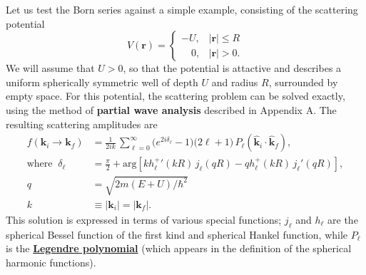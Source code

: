 \documentclass[pra,12pt]{revtex4}
\begin{document}
Let us test the Born series against a simple example, consisting of
the scattering potential
\begin{equation}
  V(\mathbf{r}) = \begin{cases}-U, & |\mathbf{r}| \le R \\ \;\;\;\,0,
    & |\mathbf{r}| > 0. \end{cases}
\end{equation}
We will assume that $U > 0$, so that the potential is attactive and
describes a uniform spherically symmetric well of depth $U$ and radius
$R$, surrounded by empty space.  For this potential, the scattering
problem can be solved exactly, using the method of \textbf{partial
  wave analysis} described in Appendix A.  The resulting scattering
amplitudes are
\begin{equation}
  \begin{aligned}f(\mathbf{k}_i \rightarrow \mathbf{k}_f) &= \frac{1}{2ik}\, \sum_{\ell =0}^\infty \big(e^{2i\delta_\ell} - 1\big) \big(2\ell+1\big)\, P_{\ell}(\hat{\mathbf{k}}_i\cdot \hat{\mathbf{k}}_f), \\ \mathrm{where}\;\; \delta_\ell &= \frac{\pi}{2} + \mathrm{arg}\!\left[k {h_\ell^+}'(kR) \, j_\ell(qR) - qh_\ell^+(kR)\, j_\ell'(qR)\right], \\ q &= \sqrt{2m(E+U)/\hbar^2} \\ k &\equiv |\mathbf{k}_i| = |\mathbf{k}_f|.\end{aligned}
\end{equation}
This solution is expressed in terms of various special functions;
$j_\ell$ and $h_\ell$ are the spherical Bessel function of the first
kind and spherical Hankel function, while $P_\ell$ is the
\href{https://en.wikipedia.org/wiki/Legendre_polynomials}{\textbf{Legendre
    polynomial}} (which appears in the definition of the spherical
harmonic functions).
\end{document}
